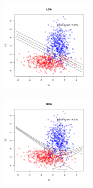 \documentclass[10pt]{article}
\begin{document}
\begin{minipage}{.5\textwidth}
	\includegraphics[width=45mm]{Figures/synth2_lda.png}
\end{minipage}%
\hspace{0.02\linewidth}
\begin{minipage}{.5\textwidth}
	\includegraphics[width=45mm]{Figures/synth2_qda.png}
\end{minipage}
\end{document}
